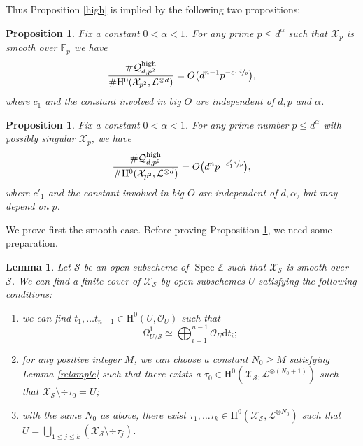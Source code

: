 \documentclass[11pt]{article}
\numberwithin{equation}{section}
\theoremstyle{plain}
\newtheorem{lem}[thm]{Lemma}
\newtheorem{prop}[thm]{Proposition}
\theoremstyle{definition}
\newcommand{\ho}{\mathrm{H}}
\newcommand{\X}{\mathcal{X}}
\newcommand{\li}{\mathcal{L}}
\newcommand{\Z}{\mathbb{Z}}
\newcommand{\F}{\mathbb{F}}
\DeclareMathOperator{\Spec}{Spec}
\begin{document}
Thus Proposition \ref{high} is implied by the following two propositions:

\begin{prop}\label{hism}
Fix a constant $0<\alpha<1$. For any prime $p\leq d^{\alpha}$ such that $\X_p$ is smooth over $\F_p$ we have
\[
\frac{\#\mathcal{Q}_{d,p^2}^{\mathrm{high}}}{\#\ho^0(\X_{p^2}, \li^{\otimes d})}=O\bigl(d^{n-1}p^{-c_1\sfrac{d}{p}} \bigr),
\]
where $c_1$ and the constant involved in big $O$ are independent of $d,p$ and $\alpha$.
\end{prop}

\begin{prop}\label{hising}
Fix a constant $0<\alpha<1$. For any prime number $p\leq d^{\alpha}$ with possibly singular $\X_p$, we have
\[
\frac{\#\mathcal{Q}_{d,p^2}^{\mathrm{high}}}{\#\ho^0(\X_{p^2}, \li^{\otimes d})}=O\bigl(d^{n}p^{-c'_1\sfrac{d}{p}} \bigr),
\]
where $c'_1$ and the constant involved in big $O$ are independent of $d,\alpha$, but may depend on $p$.
\end{prop}

We prove first the smooth case. Before proving Proposition \ref{hism}, we need some preparation.
\begin{lem}\label{opensub}
Let $\mathcal{S}$ be an open subscheme of $\Spec \Z$ such that $\X_{\mathcal{S}}$ is smooth over~$\mathcal{S}$. We can find a finite cover of $\X_{\mathcal{S}}$ by open subschemes $U$ satisfying the following conditions:
\begin{enumerate}
\item\label{opensub1} we can find $t_{1},\dots t_{n-1}\in \ho^0(U, \mathcal{O}_{U})$ such that
\[
\Omega_{U/\mathcal{S}}^1\simeq \bigoplus_{i=1}^{n-1} \mathcal{O}_{U}\mathrm{d} t_{i};
\]
\item\label{opensub2} for any positive integer $M$, we can choose a constant $N_0\geq M$ satisfying Lemma \ref{relample} such that there exists a $\tau_0 \in \ho^0(\X_{\mathcal{S}}, \li^{\otimes(N_0+1)})$ such that $\X_{\mathcal{S}}\setminus\div \tau_0=U$;
\item\label{opensub3} with the same $N_0$ as above, there exist $\tau_{1},\dots \tau_{k}\in \ho^0(\X_{\mathcal{S}}, \li^{\otimes N_0})$ such that $U=\bigcup_{1\leq j\leq k}(\X_{\mathcal{S}}\setminus \div \tau_{j})$.
\end{enumerate}
\end{lem}
\end{document}
